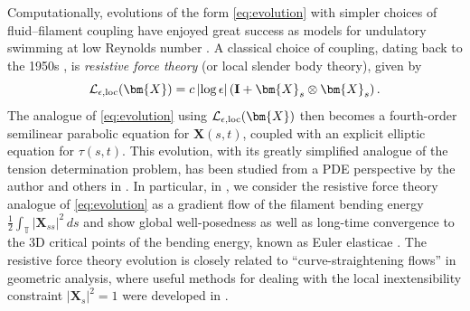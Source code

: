 \documentclass[11pt,reqno]{amsart}
\newcommand{\T}{\mathbb{T}}
\newcommand{\X}{\bm{X}}
\newcommand{\abs}[1]{\left\lvert #1 \right\rvert}
\newcommand{\mc}[1]{\mathcal{#1}}
\theoremstyle{definition}
\begin{document}
Computationally, evolutions of the form \eqref{eq:evolution} with simpler choices of fluid--filament coupling have enjoyed great success as models for undulatory swimming at low Reynolds number
\cite{cox1970motion, batchelor1970slender, hines1978bend, wiggins1998flexive, camalet2000generic, camalet1999self, johnson1979flagellar, keller1976swimming, pironneau1974optimal, lauga2009hydrodynamics, mori2023well}. A classical choice of coupling, dating back to the 1950s \cite{gray1955propulsion}, is \emph{resistive force theory} (or local slender body theory), given by 
\begin{equation}\label{eq:RFT}
\mc{L}_{\epsilon,\rm loc}(\X)= c\abs{\log\epsilon}({\bf I}+\X_s\otimes\X_s)\,.
\end{equation}
The analogue of \eqref{eq:evolution} using $\mc{L}_{\epsilon,\rm loc}(\X)$ then becomes a fourth-order semilinear parabolic equation for $\X(s,t)$, coupled with an explicit elliptic equation for $\tau(s,t)$. 
This evolution, with its greatly simplified analogue of the tension determination problem, has been studied from a PDE perspective by the author and others in \cite{albritton2025rods,mori2023well,moreau2025n}. In particular, in \cite{albritton2025rods}, we consider the resistive force theory analogue of \eqref{eq:evolution} as a gradient flow of the filament bending energy $\frac{1}{2}\int_\T\abs{\X_{ss}}^2\,ds$ and show global well-posedness as well as long-time convergence to the 3D critical points of the bending energy, known as Euler elasticae \cite{EulerOriginal, levien2008elastica, matsutani2010euler}. The resistive force theory evolution is closely related to ``curve-straightening flows'' in geometric analysis, where useful methods for dealing with the local inextensibility constraint $\abs{\X_s}^2=1$ were developed in \cite{koiso1996motion,oelz2011curve}.
\end{document}
